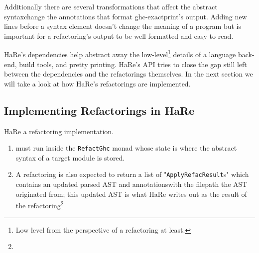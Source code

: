 Additionally there are several transformations that \DIFdelbegin {}\DIFdelend \DIFaddbegin {}\DIFaddend affect the abstract syntax\DIFdelbegin {}\DIFdelend \DIFaddbegin {}\DIFaddend change the annotations that format ghc-exactprint's output. Adding new lines before a syntax element doesn't change the meaning of a program but is important for a refactoring's output to be well formatted and easy to read. 

HaRe's dependencies help abstract away the low-level\footnote{Low level from the perspective of a refactoring at least.} details of a language back-end, build tools, and pretty printing. HaRe's API tries to close the gap still left between the dependencies and the refactorings themselves. In the next section we will take a look at how HaRe's refactorings are implemented.


\subsection{Implementing Refactorings in HaRe}

HaRe \DIFdelbegin {}\DIFdelend \DIFaddbegin {}\DIFaddend a refactoring implementation. \DIFdelbegin {}\DIFdelend \DIFaddbegin {}

\begin{enumerate}
\item {}\DIFaddend must run inside \DIFdelbegin {}\DIFdelend the \texttt{RefactGhc} monad whose state is where the abstract syntax of a target module is stored.
\DIFaddbegin \item \DIFaddend A refactoring is also expected to return a list of  "\texttt{ApplyRefacResult}s" which contains an updated parsed AST and annotations\DIFdelbegin {}\DIFdelend \DIFaddbegin {}\DIFaddend with the filepath the AST originated from; this updated AST is what HaRe writes out as the result of the refactoring\DIFdelbegin \footnote{}  
\addtocounter{footnote}{-1}%
\DIFdelend \DIFaddbegin {}\end{enumerate}
\DIFaddend 

